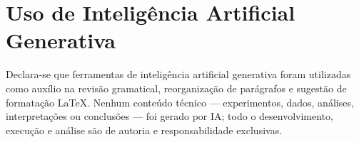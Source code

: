 \documentclass[12pt]{article}
\begin{document}
\section*{Uso de Inteligência Artificial Generativa}

Declara-se que ferramentas de inteligência artificial generativa
foram utilizadas como auxílio na revisão gramatical, reorganização de parágrafos
e sugestão de formatação LaTeX. Nenhum conteúdo técnico --- experimentos, dados,
análises, interpretações ou conclusões --- foi gerado por IA; todo o
desenvolvimento, execução e análise são de autoria e responsabilidade exclusivas.



\end{document}
